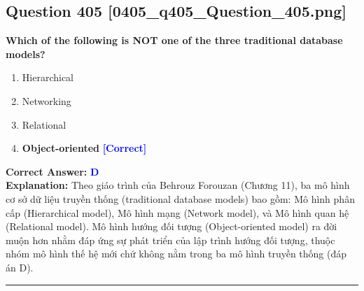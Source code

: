 \documentclass[11pt,a4paper]{article}
\begin{document}
\begin{minipage}{\textwidth}
\subsection*{Question 405 \quad \footnotesize{[0405\_q405\_Question\_405.png]}}
\noindent \textbf{Which of the following is NOT one of the three traditional database models?}

\begin{enumerate}[label=\Alph*.]
    \item Hierarchical
    \item Networking
    \item Relational
    \item \textbf{Object-oriented} \hfill \textcolor{blue}{\textbf{[Correct]}}
\end{enumerate}

\noindent \textbf{Correct Answer:} \textcolor{blue}{\textbf{D}} \\[2pt]
\noindent \textbf{Explanation:} Theo giáo trình của Behrouz Forouzan (Chương 11), ba mô hình cơ sở dữ liệu truyền thống (traditional database models) bao gồm: Mô hình phân cấp (Hierarchical model), Mô hình mạng (Network model), và Mô hình quan hệ (Relational model). Mô hình hướng đối tượng (Object-oriented model) ra đời muộn hơn nhằm đáp ứng sự phát triển của lập trình hướng đối tượng, thuộc nhóm mô hình thế hệ mới chứ không nằm trong ba mô hình truyền thống (đáp án D).

\par\vspace{0.3cm}
\hrule
\vspace{0.3cm}
\end{minipage}
\end{document}
